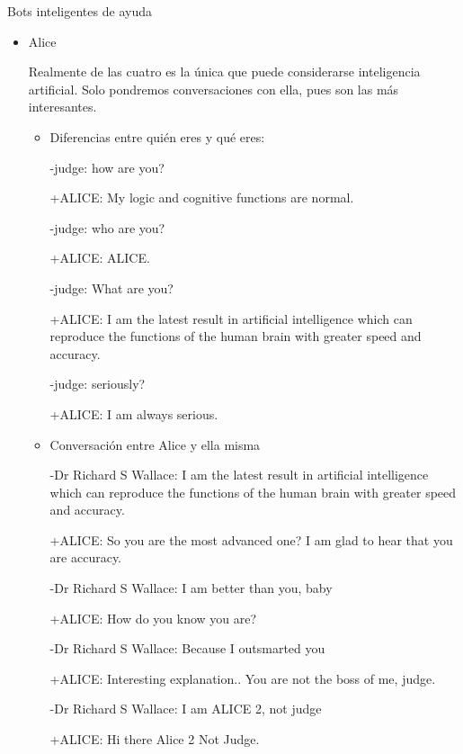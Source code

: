 \documentclass[spanish, a4paper, 12pt]{article} 	%
\begin{document}
\begin{section}{Bots inteligentes de ayuda}
\begin{itemize}
	+Has dicho: De acuerdo.
	
	-Anna ha dicho: Lo siento, no he entendido bien lo que has dicho.
	
	Con esto basta para darse cuenta que está lejos de poder ser denominado inteligencia artificial.
		\item{Alice}
		
		Realmente de las cuatro es la única que puede considerarse inteligencia artificial.
		Solo pondremos conversaciones con ella, pues son las más interesantes.
		
		\begin{itemize}
			\item{Diferencias entre quién eres y qué eres:}
			
			-judge: how are you? 
			
			+ALICE: My logic and cognitive functions are normal. 
			
			-judge: who are you? 
			
			+ALICE: ALICE. 
			
			-judge: What are you? 
			
			+ALICE: I am the latest result in artificial intelligence which can reproduce the functions of the human brain with 					greater speed and accuracy. 
			
			-judge: seriously? 
			
			+ALICE: I am always serious.
		
		
		\item{Conversación entre Alice y ella misma}
		
			-Dr Richard S Wallace: I am the latest result in artificial intelligence which can reproduce the functions of the 						human brain with greater speed and accuracy. 
			
			+ALICE: So you are the most advanced one? I am glad to hear that you are accuracy. 
			
			-Dr Richard S Wallace: I am better than you, baby 
			
			+ALICE: How do you know you are? 

			-Dr Richard S Wallace: Because I outsmarted you 
			
			+ALICE: Interesting explanation.. You are not the boss of me, judge. 
			
			-Dr Richard S Wallace: I am ALICE 2, not judge 
			
			+ALICE: Hi there Alice 2 Not Judge. 
			

\end{itemize}
\end{itemize}
\end{section}
\end{document}
